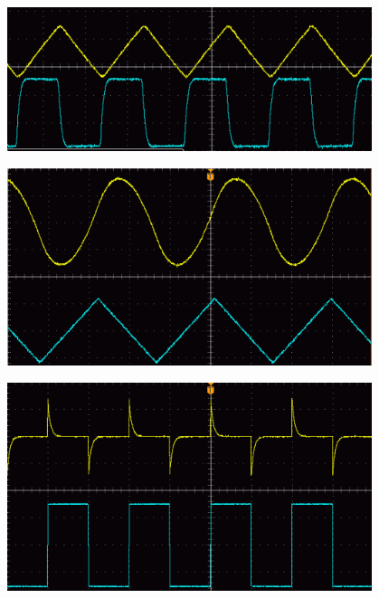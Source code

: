 \documentclass[11pt, a4paper]{article}
\begin{document}
    \begin{image}[h]
        \centering
        \includegraphics[width=0.8\textwidth]{Tiefpass_Integrierend_rec.png}
        \caption{Tiefpassfilter mit 100 \si{\kilo\hertz} Rechtecksignal}
        \label{im:Tirec}
    \end{image}
    \begin{image}[h]
        \centering
        \includegraphics[width=0.8\textwidth]{Tiefpass_Integrierend_tri.png}
        \caption{Tiefpassfilter mit 100 \si{\kilo\hertz} Dreieckssignal}
        \label{im:Titri}
    \end{image}
    \begin{image}[h]
        \centering
        \includegraphics[width=0.8\textwidth]{Hochpass_differenzierend_rec.png}
        \caption{Hochpass mit 1 \si{\kilo\hertz} Rechtecksignal}
        \label{im:Horec}
    \end{image}
\end{document}
